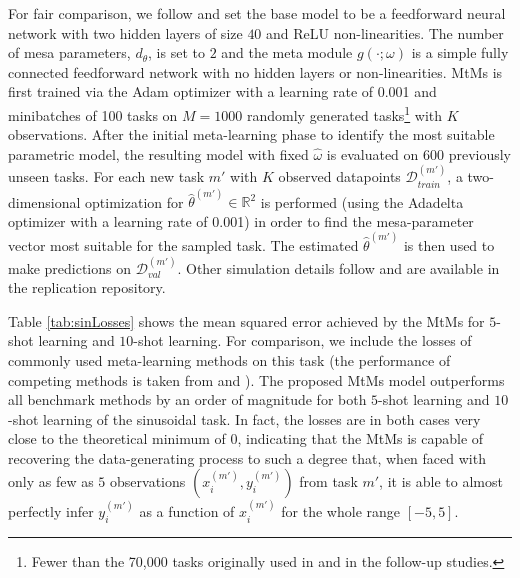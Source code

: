 \documentclass[3p,times,twocolumn]{elsarticle}
\begin{document}
For fair comparison, we follow \citet{finnModelAgnosticMetaLearningFast2017} and set the base model to be a feedforward neural network with two hidden layers of size $40$ and ReLU non-linearities.
The number of mesa parameters, $d_{\theta}$, is set to $2$ and the meta module $g(\cdot;\omega)$ is a simple fully connected feedforward network with no hidden layers or non-linearities.
MtMs is first trained via the Adam optimizer with a learning rate of 0.001 and minibatches of 100 tasks on $M=1000$ randomly generated tasks\footnote{Fewer than the 70,000 tasks originally used in \citet{finnModelAgnosticMetaLearningFast2017} and in the follow-up studies.} with $K$ observations.
After the initial meta-learning phase to identify the most suitable parametric model, the resulting model with fixed $\hat{\omega}$ is evaluated on 600 previously unseen tasks.
For each new task $m'$ with $K$ observed datapoints $\mathcal{D}_{train}^{(m')}$, a two-dimensional optimization for $\hat{\theta}^{(m')}\in \mathbb{R}^{2}$ is performed (using the Adadelta optimizer with a learning rate of 0.001) in order to find the mesa-parameter vector most suitable for the sampled task.
The estimated $\hat{\theta}^{(m')}$ is then used to make predictions on $\mathcal{D}_{val}^{(m')}$.
Other simulation details follow \citet{zhaoMetaLearningHypernetworks2020} and are available in the replication repository.

Table \ref{tab:sinLosses} shows the mean squared error achieved by the MtMs for $5$-shot learning and $10$-shot learning.
For comparison, we include the losses of commonly used meta-learning methods on this task (the performance of competing methods is taken from \citet{parkMetacurvature2019} and \citet{zhaoMetaLearningHypernetworks2020}).
The proposed MtMs model outperforms all benchmark methods by an order of magnitude for both $5$-shot learning and $10$-shot learning of the sinusoidal task.
In fact, the losses are in both cases very close to the theoretical minimum of $0$, indicating that the MtMs is capable of recovering the data-generating process to such a degree that, when faced with only as few as $5$ observations $(x_{i}^{(m')},y_{i}^{(m')})$ from task $m'$, it is able to almost perfectly infer $y_{i}^{(m')}$ as a function of $x_{i}^{(m')}$ for the whole range $[-5,5]$.
\end{document}
